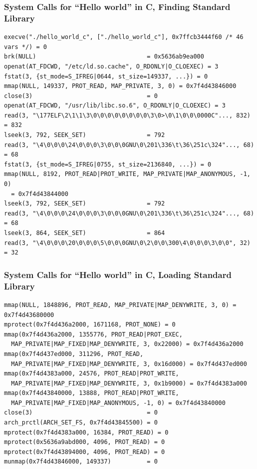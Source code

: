 \documentclass[aspectratio=169]{beamer}
\begin{document}
  \begin{frame}[fragile]
    \frametitle{System Calls for ``Hello world'' in C, Finding Standard Library}
    \begin{lstlisting}[basicstyle=\ttfamily\footnotesize]
execve("./hello_world_c", ["./hello_world_c"], 0x7ffcb3444f60 /* 46 vars */) = 0
brk(NULL)                               = 0x5636ab9ea000
openat(AT_FDCWD, "/etc/ld.so.cache", O_RDONLY|O_CLOEXEC) = 3
fstat(3, {st_mode=S_IFREG|0644, st_size=149337, ...}) = 0
mmap(NULL, 149337, PROT_READ, MAP_PRIVATE, 3, 0) = 0x7f4d43846000
close(3)                                = 0
openat(AT_FDCWD, "/usr/lib/libc.so.6", O_RDONLY|O_CLOEXEC) = 3
read(3, "\177ELF\2\1\1\3\0\0\0\0\0\0\0\0\3\0>\0\1\0\0\0000C"..., 832) = 832
lseek(3, 792, SEEK_SET)                 = 792
read(3, "\4\0\0\0\24\0\0\0\3\0\0\0GNU\0\201\336\t\36\251c\324"..., 68) = 68
fstat(3, {st_mode=S_IFREG|0755, st_size=2136840, ...}) = 0
mmap(NULL, 8192, PROT_READ|PROT_WRITE, MAP_PRIVATE|MAP_ANONYMOUS, -1, 0)
  = 0x7f4d43844000
lseek(3, 792, SEEK_SET)                 = 792
read(3, "\4\0\0\0\24\0\0\0\3\0\0\0GNU\0\201\336\t\36\251c\324"..., 68) = 68
lseek(3, 864, SEEK_SET)                 = 864
read(3, "\4\0\0\0\20\0\0\0\5\0\0\0GNU\0\2\0\0\300\4\0\0\0\3\0\0", 32) = 32
    \end{lstlisting}
  \end{frame}

  \begin{frame}[fragile]
    \frametitle{System Calls for ``Hello world'' in C, Loading Standard Library}

    \begin{lstlisting}[basicstyle=\ttfamily\footnotesize]
mmap(NULL, 1848896, PROT_READ, MAP_PRIVATE|MAP_DENYWRITE, 3, 0) = 0x7f4d43680000
mprotect(0x7f4d436a2000, 1671168, PROT_NONE) = 0
mmap(0x7f4d436a2000, 1355776, PROT_READ|PROT_EXEC,
  MAP_PRIVATE|MAP_FIXED|MAP_DENYWRITE, 3, 0x22000) = 0x7f4d436a2000
mmap(0x7f4d437ed000, 311296, PROT_READ,
  MAP_PRIVATE|MAP_FIXED|MAP_DENYWRITE, 3, 0x16d000) = 0x7f4d437ed000
mmap(0x7f4d4383a000, 24576, PROT_READ|PROT_WRITE,
  MAP_PRIVATE|MAP_FIXED|MAP_DENYWRITE, 3, 0x1b9000) = 0x7f4d4383a000
mmap(0x7f4d43840000, 13888, PROT_READ|PROT_WRITE,
  MAP_PRIVATE|MAP_FIXED|MAP_ANONYMOUS, -1, 0) = 0x7f4d43840000
close(3)                                = 0
arch_prctl(ARCH_SET_FS, 0x7f4d43845500) = 0
mprotect(0x7f4d4383a000, 16384, PROT_READ) = 0
mprotect(0x5636a9abd000, 4096, PROT_READ) = 0
mprotect(0x7f4d43894000, 4096, PROT_READ) = 0
munmap(0x7f4d43846000, 149337)          = 0
    \end{lstlisting}
  \end{frame}
\end{document}
